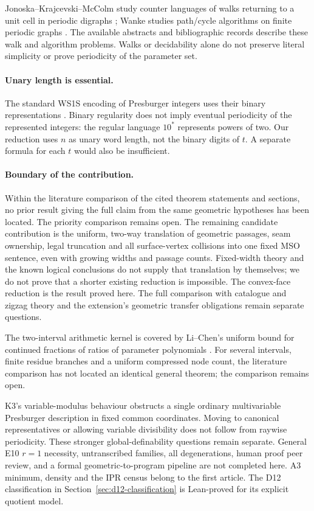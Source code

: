 \documentclass[11pt]{amsart}
\theoremstyle{definition}\newtheorem{definition}{Definition}
\begin{document}
Jonoska--Krajcevski--McColm study counter languages of walks returning
to a unit cell in periodic digraphs \cite{Counter}; Wanke studies
path/cycle algorithms on finite periodic graphs \cite{Wanke}.
The available abstracts and bibliographic records describe these
walk and algorithm problems. Walks or
decidability alone do not preserve literal simplicity or prove
periodicity of the parameter set.

\paragraph{Unary length is essential.}
The standard WS1S encoding of Presburger integers uses their binary
representations \cite[printed pp.~11--12]{Thomas}. Binary regularity
does not imply eventual periodicity of the represented integers:
the regular language $10^*$ represents powers of two. Our reduction
uses $n$ as unary word length, not the binary digits of $t$.
A separate formula for each $t$ would also be insufficient.

\paragraph{Boundary of the contribution.}
Within the literature comparison of the cited theorem statements
and sections, no prior result giving the full claim from the same
geometric hypotheses has been located. The priority comparison remains
open. The
remaining candidate contribution is the uniform, two-way translation
of geometric passages, seam ownership, legal truncation and all
surface-vertex collisions into one fixed MSO sentence, even with
growing widths and passage counts. Fixed-width theory and the known
logical conclusions do not supply that translation by themselves;
we do not prove that a shorter existing reduction is impossible.
The convex-face reduction is the result proved here. The full
comparison with catalogue and zigzag theory and the extension's
geometric transfer obligations remain separate questions.

The two-interval arithmetic kernel is covered by Li--Chen's uniform
bound for continued fractions of ratios of parameter polynomials
\cite[Theorem 27]{LiChen}. For several intervals, finite residue
branches and a uniform compressed node count, the literature comparison has not located an identical general theorem;
the comparison remains open.

K3's variable-modulus behaviour obstructs a single ordinary
multivariable Presburger description in fixed common coordinates.
Moving to canonical representatives or allowing variable divisibility
does not follow from raywise periodicity. These stronger global-definability questions remain separate. General E10 $r=1$ necessity, untranscribed
families, all degenerations, human proof peer review, and a formal
geometric-to-program pipeline are not completed here. A3 minimum,
density and the IPR census belong to the first article. The D12 classification in Section~\ref{sec:d12-classification} is Lean-proved for its explicit quotient model.
\end{document}
